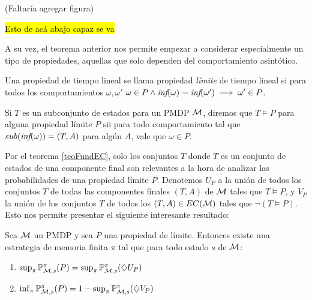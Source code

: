 (Faltaría agregar figura)

\hl{Esto de acá abajo capaz se va}

A su vez, el teorema anterior nos permite empezar a considerar especialmente un
tipo de propiedades, aquellas que solo dependen del comportamiento asintótico.

\begin{definition}
	Una propiedad de tiempo lineal se llama propiedad \textit{límite} de tiempo lineal si para todos los comportamientos $\omega, \omega'$ $\omega \in P \wedge \textit{inf}(\omega) = \textit{inf}(\omega') \implies \omega' \in P$.

	Si $T$ es un subconjunto de estados para un PMDP $\mathcal{M}$, diremos que $T \models
		P$ para alguna propiedad límite $P$ sii para todo comportamiento tal que
	$sub(\textit{inf}(\omega)) = (T,A)$ para algún $A$, vale que $\omega \in P$.
\end{definition}

Por el teorema \ref{teoFundEC}, solo los conjuntos $T$ donde $T$ es un conjunto
de estados de una componente final son relevantes a la hora de analizar las
probabilidades de una propiedad límite $P$. Denotemos $U_P$ a la unión de todos
los conjuntos $T$ de todas las componentes finales $(T,A)$ de $\mathcal{M}$ tales que $T
	\models P$, y $V_P$ la unión de los conjuntos $T$ de todos los $(T,A) \in
	EC(\mathcal{M})$ tales que $\neg (T \models P)$. Esto nos permite presentar el siguiente
interesante resultado:


\begin{theorem}
	\label{rabinAlcPMDP}
	Sea $\mathcal{M}$ un PMDP y sea $P$ una propiedad de límite. Entonces existe una estrategia de memoria finita $\pi$ tal que para todo estado $s$ de $\mathcal{M}$:

	\begin{enumerate}[label=(\alph*)]
		\item $\sup_{\pi} \mathbb{P}_{\mathcal{M}, s}^\pi (P) = \sup_{\pi} \mathbb{P}_{\mathcal{M}, s}^\pi (\diamondsuit U_P)$

		\item $\inf_{\pi} \mathbb{P}_{\mathcal{M}, s}^\pi (P) = 1 - \sup_{\pi} \mathbb{P}_{\mathcal{M}, s}^\pi (\diamondsuit V_P)$
	\end{enumerate}
\end{theorem}


